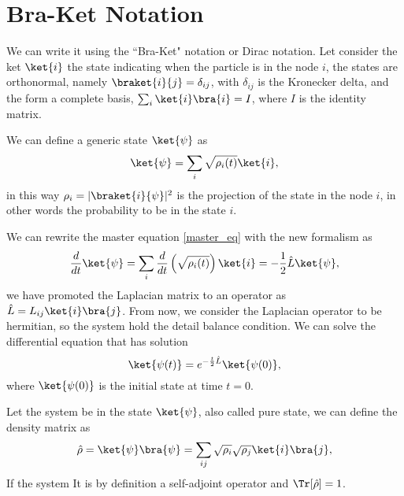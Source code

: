 \section{Bra-Ket Notation}
We can write it using the ``Bra-Ket" notation or Dirac notation. Let consider the ket $\ket{i}$ the state indicating when the particle is in the node $i$, the states are orthonormal, namely $\braket{i}{j}=\delta_{ij}$, with $\delta_{ij}$ is the Kronecker delta, and the form a complete basis, $\sum_i \ket{i}\bra{i} = I$, where $I$ is the identity matrix.

We can define a generic state $\ket{\psi}$ as
\begin{equation}\label{ket_state}
    \ket{\psi} = \sum_i \sqrt{\rho_i(t)} \ket{i},
\end{equation}
in this way $\rho_i = |\braket{i}{\psi}|^2$ is the projection of the state in the node $i$, in other words the probability to be in the state $i$.

We can rewrite the master equation \eqref{master_eq} with the new formalism as
\begin{equation}\label{master_eq_braket}
    \frac{d}{dt}\ket{\psi} = \sum_i\frac{d}{dt}\left(\sqrt{\rho_i(t)}\right)\ket{i} = - \frac{1}{2}\hat L \ket{\psi},
\end{equation}
we have promoted the Laplacian matrix to an operator as $\hat L = L_{ij} \ket{i}\bra{j}$. From now, we consider the Laplacian operator to be hermitian, so the system hold the detail balance condition.
We can solve the differential equation that has solution
\begin{equation}
    \ket{\psi(t)} = e^{-\frac{t}{2}\hat L}\ket{\psi(0)},
\end{equation}
where $\ket{\psi(0)}$ is the initial state at time $t=0$.

Let the system be in the state $\ket{\psi}$, also called pure state, we can define the density matrix as
\begin{equation}
    \hat\rho =\ket{\psi}\bra{\psi} = \sum_{ij} \sqrt{\rho_i} \sqrt{\rho_j}\ket{i}\bra{j},
\end{equation}
If the system 
It is by definition a self-adjoint operator and $\Tr[\hat\rho] = 1$.

